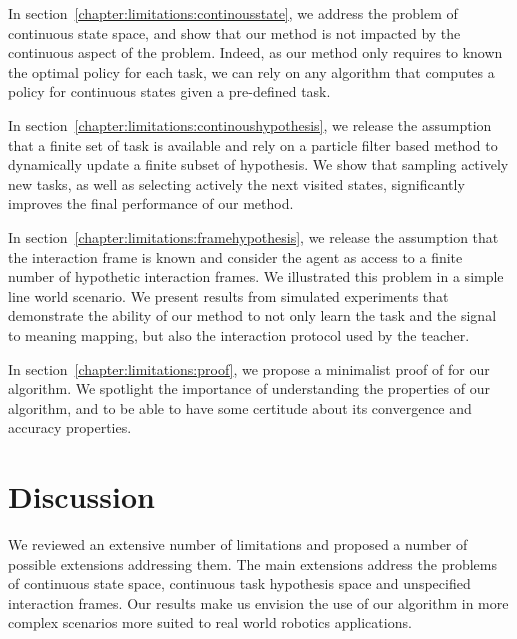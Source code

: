 In section~\ref{chapter:limitations:continousstate}, we address the problem of continuous state space, and show that our method is not impacted by the continuous aspect of the problem. Indeed, as our method only requires to known the optimal policy for each task, we can rely on any algorithm that computes a policy for continuous states given a pre-defined task.

In section~\ref{chapter:limitations:continoushypothesis}, we release the assumption that a finite set of task is available and rely on a particle filter based method to dynamically update a finite subset of hypothesis. We show that sampling actively new tasks, as well as selecting actively the next visited states, significantly improves the final performance of our method.

In section~\ref{chapter:limitations:framehypothesis}, we release the assumption that the interaction frame is known and consider the agent as access to a finite number of hypothetic interaction frames. We illustrated this problem in a simple line world scenario. We present results from simulated experiments that demonstrate the ability of our method to not only learn the task and the signal to meaning mapping, but also the interaction protocol used by the teacher.

In section~\ref{chapter:limitations:proof}, we propose a minimalist proof of for our algorithm. We spotlight the importance of understanding the properties of our algorithm, and to be able to have some certitude about its convergence and accuracy properties.




% 



% 


\section{Discussion}
\label{chapter:limitations:discussion}

We reviewed an extensive number of limitations and proposed a number of possible extensions addressing them. The main extensions address the problems of continuous state space, continuous task hypothesis space and unspecified interaction frames. Our results make us envision the use of our algorithm in more complex scenarios more suited to real world robotics applications.
